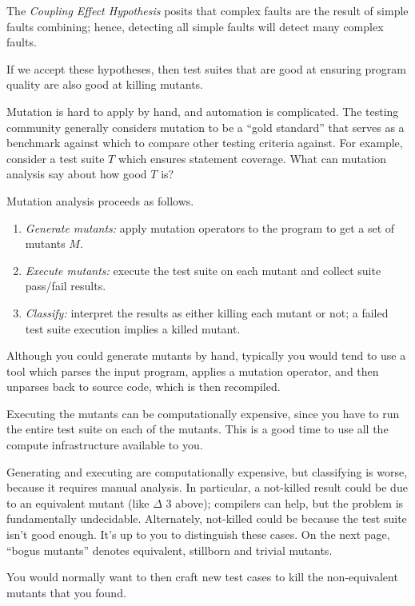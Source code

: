 \documentclass[11pt]{article}
\begin{document}
The \emph{Coupling Effect Hypothesis} posits that complex faults are the result of
simple faults combining; hence, detecting all simple faults will detect many
complex faults.

If we accept these hypotheses, then test suites that are good at ensuring program
quality are also good at killing mutants.

Mutation is hard to apply by hand, and automation is
complicated.  The testing community generally considers mutation to be
a ``gold standard'' that serves as a benchmark against which to
compare other testing criteria against. For example, consider a test suite
$T$ which ensures statement coverage. What can mutation analysis say about
how good $T$ is?

Mutation analysis proceeds as follows.

\begin{enumerate}[noitemsep]
\item \emph{Generate mutants:} apply mutation operators to the program to get a set of mutants $M$. 
\item \emph{Execute mutants:} execute the test suite on each mutant and collect suite pass/fail results.
\item \emph{Classify:} interpret the results as either killing each mutant or not; a failed test suite execution implies a killed mutant.
\end{enumerate}

Although you could generate mutants by hand, typically you would tend to use a tool which parses the input program, applies a mutation operator, and then unparses back to source code, which is then recompiled.

Executing the mutants can be computationally expensive, since you have to run the entire test suite on each of the mutants. This is a good time to use all the compute infrastructure available to you.

Generating and executing are computationally expensive, but classifying is worse, because it requires manual analysis. In particular, a not-killed result could be due to an equivalent mutant (like $\Delta$ 3 above); compilers can help, but the problem is fundamentally undecidable. Alternately, not-killed could be because the test suite isn't good enough. It's up to you to distinguish these cases. On the next page, ``bogus mutants'' denotes equivalent, stillborn and trivial mutants.

You would normally want to then craft new test cases to kill the non-equivalent mutants that you found.
\end{document}
